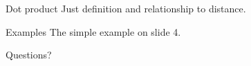 \documentclass{beamer}
\begin{document}
\begin{frame}{Dot product}
  Just definition and relationship to distance.
\end{frame}

\begin{frame}{Examples}
  The simple example on slide 4.
\end{frame}

\begin{frame}
  Questions?
\end{frame}
\end{document}
